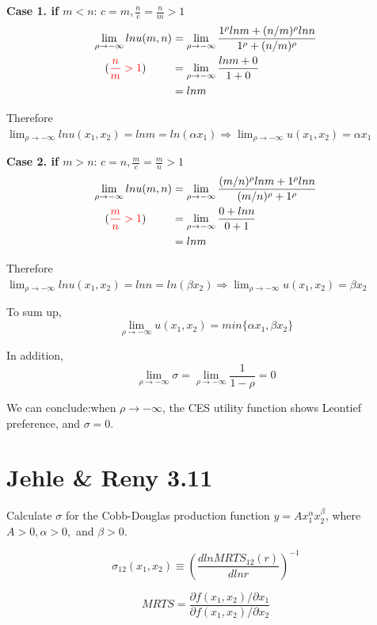 \documentclass{article}
\begin{document}
\begin{mdframed}[backgroundcolor=blue!20,linecolor=white]
\textbf{Case 1. if $m<n$}: $c = m, \frac{n}{c} = \frac{n}{m} >1$
\begin{align*}
\lim_{\rho \to -\infty} ln u(m,n) &= \lim_{\rho \to -\infty} \frac{1^\rho ln m+ (n/m)^\rho ln n}{1^\rho + (n/m)^\rho} \\
(\textcolor{red}{\frac{n}{m} >1}) \ \ \ \ \ \ \ &= \lim_{\rho \to -\infty} \frac{ln m+ 0}{1 + 0} \\
&= ln m 
\end{align*}

Therefore $\lim_{\rho \to -\infty} ln u(x_1,x_2) =ln m = ln (\alpha x_1) \Rightarrow \lim_{\rho \to -\infty} u(x_1,x_2) =  \alpha x_1$

\vspace{2mm}

\textbf{Case 2. if $m>n$}: $c = n, \frac{m}{c} = \frac{m}{n} >1$
\begin{align*}
\lim_{\rho \to -\infty} ln u(m,n) &= \lim_{\rho \to -\infty} \frac{(m/n)^\rho ln m+ 1^\rho ln n}{(m/n)^\rho + 1^\rho} \\
(\textcolor{red}{\frac{m}{n} >1}) \ \ \ \ \ \ \ &= \lim_{\rho \to -\infty} \frac{ 0 + ln n}{0 + 1} \\
&= ln m
\end{align*}

Therefore $\lim_{\rho \to -\infty} ln u(x_1,x_2) =ln n = ln (\beta x_2) \Rightarrow \lim_{\rho \to -\infty} u(x_1,x_2) =  \beta x_2$

\vspace{2mm}


To sum up, $$\lim_{\rho \to -\infty} u(x_1,x_2) = min\{\alpha x_1,\beta x_2\}$$

In addition, $$\lim_{\rho \to -\infty} \sigma =\lim_{\rho \to -\infty} \frac{1}{1-\rho} = 0$$

We can conclude:when $\rho \to -\infty$, the CES utility function shows Leontief preference, and $\sigma = 0$.
\end{mdframed}

\section{Jehle \& Reny 3.11}
Calculate $\sigma$ for the Cobb-Douglas production function $y = Ax_1^\alpha x_2^\beta$, where $A > 0,\alpha > 0,$ and $\beta > 0$.

\begin{mdframed}[backgroundcolor=blue!20,linecolor=white]
$$\sigma_{12}(x_1,x_2) \equiv (\frac{d ln MRTS_{12}(r)}{dln r})^{-1}$$

$$ MRTS = \frac{\partial f(x_1,x_2) / \partial x_1}{\partial f(x_1,x_2) / \partial x_2}$$

\end{mdframed}
\end{document}
